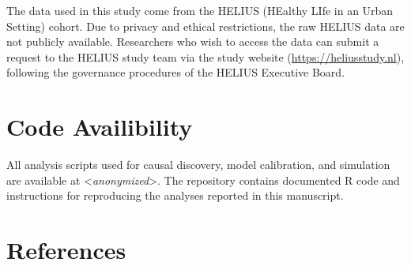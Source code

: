 \documentclass[
]{article}
\begin{document}
The data used in this study come from the HELIUS (HEalthy LIfe in an
Urban Setting) cohort. Due to privacy and ethical restrictions, the raw
HELIUS data are not publicly available. Researchers who wish to access
the data can submit a request to the HELIUS study team via the study
website (\url{https://heliusstudy.nl}), following the governance
procedures of the HELIUS Executive Board.

\section{Code Availibility}\label{code-availibility}

All analysis scripts used for causal discovery, model calibration, and
simulation are available at \textless{}\emph{anonymized}\textgreater.
The repository contains documented R code and instructions for
reproducing the analyses reported in this manuscript.

\section{References}\label{references}
\end{document}
